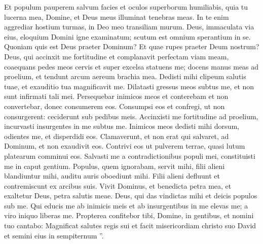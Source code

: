 \begin{biblechapter}
\begin{biblechapter}
\begin{biblechapter}
\begin{biblechapter}
\begin{biblechapter}
\begin{biblechapter}
\begin{biblechapter}
\begin{biblechapter}
\begin{biblechapter}
\begin{biblechapter}
\begin{biblechapter}
\begin{biblechapter}
\begin{biblechapter}
\begin{biblechapter}
\begin{biblechapter}
\begin{biblechapter}
\begin{biblechapter}
\begin{biblechapter}
\begin{biblechapter}
\begin{biblechapter}
\begin{biblechapter}
\begin{biblechapter}
 \verse Et populum pauperem salvum facies
 et oculos superborum humiliabis,
 \verse quia tu lucerna mea, Domine,
 et Deus meus illuminat tenebras meas.
 \verse In te enim aggrediar hostium turmas,
 in Deo meo transiliam murum.
 \verse Deus, immaculata via eius,
 eloquium Domini igne examinatum;
 scutum est omnium sperantium in se.
 \verse Quoniam quis est Deus praeter Dominum?
 Et quae rupes praeter Deum nostrum?
 \verse Deus, qui accinxit me fortitudine
 et complanavit perfectam viam meam,
 \verse coaequans pedes meos cervis
 et super excelsa statuens me;
 \verse docens manus meas ad proelium,
 et tendunt arcum aereum brachia mea.
 \verse Dedisti mihi clipeum salutis tuae,
 et exauditio tua magnificavit me.
 \verse Dilatasti gressus meos subtus me,
 et non sunt infirmati tali mei.
 \verse Persequebar inimicos meos et conterebam
 et non convertebar, donec consumerem eos.
 \verse Consumpsi eos et confregi, ut non consurgerent:
 ceciderunt sub pedibus meis.
 \verse Accinxisti me fortitudine ad proelium,
 incurvasti insurgentes in me subtus me.
 \verse Inimicos meos dedisti mihi dorsum,
 odientes me, et disperdidi eos.
 \verse Clamaverunt, et non erat qui salvaret,
 ad Dominum, et non exaudivit eos. 
\verse Contrivi eos ut pulverem terrae,
 quasi lutum platearum comminui eos.
 \verse Salvasti me a contradictionibus populi mei,
 constituisti me in caput gentium.
 Populus, quem ignorabam, servit mihi,
 \verse filii alieni blandiuntur mihi,
 auditu auris oboediunt mihi.
 \verse Filii alieni defluunt
 et contremiscunt ex arcibus suis.
 \verse Vivit Dominus, et benedicta petra mea,
 et exaltetur Deus, petra salutis meae.
 \verse Deus, qui das vindictas mihi
 et deicis populos sub me.
 \verse Qui educis me ab inimicis meis
 et ab insurgentibus in me elevas me;
 a viro iniquo liberas me.
 \verse Propterea confitebor tibi, Domine, in gentibus,
 et nomini tuo cantabo:
 \verse Magnificat salutes regis sui
 et facit misericordiam christo suo David
 et semini eius in sempiternum ”.
 

\end{biblechapter}
\end{biblechapter}
\end{biblechapter}
\end{biblechapter}
\end{biblechapter}
\end{biblechapter}
\end{biblechapter}
\end{biblechapter}
\end{biblechapter}
\end{biblechapter}
\end{biblechapter}
\end{biblechapter}
\end{biblechapter}
\end{biblechapter}
\end{biblechapter}
\end{biblechapter}
\end{biblechapter}
\end{biblechapter}
\end{biblechapter}
\end{biblechapter}
\end{biblechapter}
\end{biblechapter}
